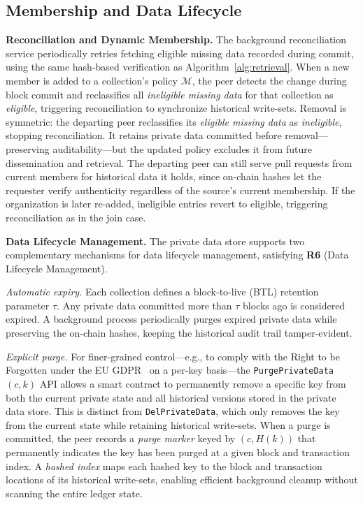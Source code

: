 \subsection{Membership and Data Lifecycle}
\label{s:dynamic-membership}

\noindent\textbf{Reconciliation and Dynamic Membership.}
The background reconciliation service periodically retries fetching eligible missing data recorded during commit, using the same hash-based verification as Algorithm~\ref{alg:retrieval}.
When a new member is added to a collection's policy $\mathcal{M}$, the peer detects the change during block commit and reclassifies all \textit{ineligible missing data} for that collection as \textit{eligible}, triggering reconciliation to synchronize historical write-sets.
Removal is symmetric: the departing peer reclassifies its \textit{eligible missing data} as \textit{ineligible}, stopping reconciliation. It retains private data committed before removal---preserving auditability---but the updated policy excludes it from future dissemination and retrieval. The departing peer can still serve pull requests from current members for historical data it holds, since on-chain hashes let the requester verify authenticity regardless of the source's current membership. If the organization is later re-added, ineligible entries revert to eligible, triggering reconciliation as in the join case.

\noindent\textbf{Data Lifecycle Management.}
\label{s:lifecycle}
The private data store supports two complementary mechanisms for data lifecycle management, satisfying \textbf{R6} (Data Lifecycle Management).

\textit{Automatic expiry.} Each collection defines a block-to-live (BTL) retention parameter $\tau$. Any private data committed more than $\tau$ blocks ago is considered expired. A background process periodically purges expired private data while preserving the on-chain hashes, keeping the historical audit trail tamper-evident.

\textit{Explicit purge.} For finer-grained control---e.g., to comply with the Right to be Forgotten under the EU GDPR~\cite{gdpr} on a per-key basis---the \texttt{Purge\-Private\-Data}$(c, k)$ API allows a smart contract to permanently remove a specific key from both the current private state and all historical versions stored in the private data store. This is distinct from \texttt{DelPrivateData}, which only removes the key from the current state while retaining historical write-sets. When a purge is committed, the peer records a \textit{purge marker} keyed by $(c, H(k))$ that permanently indicates the key has been purged at a given block and transaction index. A \textit{hashed index} maps each hashed key to the block and transaction locations of its historical write-sets, enabling efficient background cleanup without scanning the entire ledger state.


